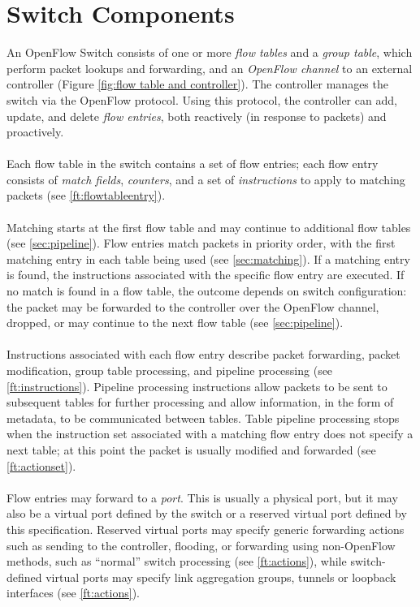 \documentclass[10pt]{article}
\begin{document}
\section{Switch Components}
An OpenFlow Switch consists of one or more \emph{flow tables} and a \emph{group table}, which perform packet lookups and forwarding, and an \emph{OpenFlow channel} to an external controller (Figure \ref{fig:flow table and controller}).  The controller manages the switch via the OpenFlow protocol.   Using this protocol, the controller can add, update, and delete \emph{flow entries}, both reactively (in response to packets) and proactively.
\\\\
Each flow table in the switch contains a set of flow entries; each flow entry consists of \emph{match fields}, \emph{counters}, and a set of \emph{instructions} to apply to matching packets (see \ref{ft:flowtableentry}).
\\\\
Matching starts at the first flow table and may continue to additional flow tables (see \ref{sec:pipeline}). Flow entries match packets in priority order, with the first matching entry in each table being used (see \ref{sec:matching}). If a matching entry is found, the instructions associated with the specific flow entry are executed. If no match is found in a flow table, the outcome depends on switch configuration: the packet may be forwarded to the controller over the OpenFlow channel, dropped, or may continue to the next flow table (see \ref{sec:pipeline}).
\\\\
Instructions associated with each flow entry describe packet forwarding, packet modification, group table processing, and pipeline processing (see \ref{ft:instructions}). Pipeline processing instructions allow packets to be sent to subsequent tables for further processing and allow information, in the form of metadata, to be communicated between tables. Table pipeline processing stops when the instruction set associated with a matching flow entry does not specify a next table; at this point the packet is usually modified and forwarded (see \ref{ft:actionset}).
\\\\
Flow entries may forward to a \emph{port}. This is usually a physical port, but it may also be a virtual port defined by the switch or a reserved virtual port defined by this specification. Reserved virtual ports may specify generic forwarding actions such as sending to the controller, flooding, or forwarding using non-OpenFlow methods, such as ``normal'' switch processing (see \ref{ft:actions}), while switch-defined virtual ports may specify link aggregation groups, tunnels or loopback interfaces (see \ref{ft:actions}).
\end{document}
